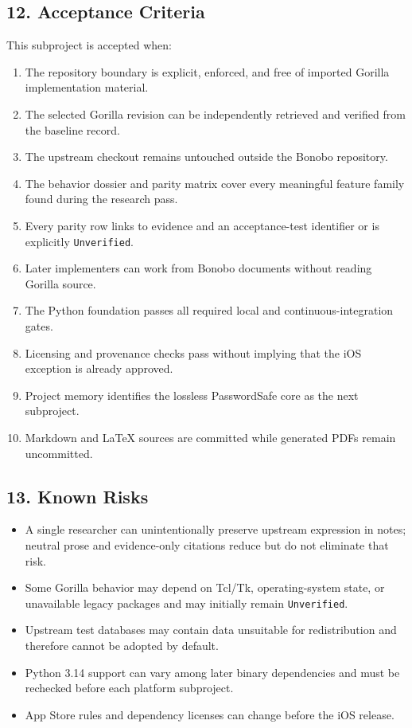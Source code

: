 \documentclass[
  letterpaper,
]{article}
\providecommand{\tightlist}{%
  \setlength{\itemsep}{0pt}\setlength{\parskip}{0pt}}
\begin{document}
\subsection{12. Acceptance Criteria}\label{12-acceptance-criteria}

This subproject is accepted when:

\begin{enumerate}
\def\labelenumi{\arabic{enumi}.}
\tightlist
\item
  The repository boundary is explicit, enforced, and free of imported Gorilla implementation material.
\item
  The selected Gorilla revision can be independently retrieved and verified from the baseline record.
\item
  The upstream checkout remains untouched outside the Bonobo repository.
\item
  The behavior dossier and parity matrix cover every meaningful feature family found during the research pass.
\item
  Every parity row links to evidence and an acceptance-test identifier or is explicitly \nolinkurl{Unverified}.
\item
  Later implementers can work from Bonobo documents without reading Gorilla source.
\item
  The Python foundation passes all required local and continuous-integration gates.
\item
  Licensing and provenance checks pass without implying that the iOS exception is already approved.
\item
  Project memory identifies the lossless PasswordSafe core as the next subproject.
\item
  Markdown and LaTeX sources are committed while generated PDFs remain uncommitted.
\end{enumerate}

\subsection{13. Known Risks}\label{13-known-risks}

\begin{itemize}
\tightlist
\item
  A single researcher can unintentionally preserve upstream expression in notes; neutral prose and evidence-only
  citations reduce but do not eliminate that risk.
\item
  Some Gorilla behavior may depend on Tcl/Tk, operating-system state, or unavailable legacy packages and may initially
  remain \nolinkurl{Unverified}.
\item
  Upstream test databases may contain data unsuitable for redistribution and therefore cannot be adopted by default.
\item
  Python 3.14 support can vary among later binary dependencies and must be rechecked before each platform subproject.
\item
  App Store rules and dependency licenses can change before the iOS release.
\end{itemize}
\end{document}
